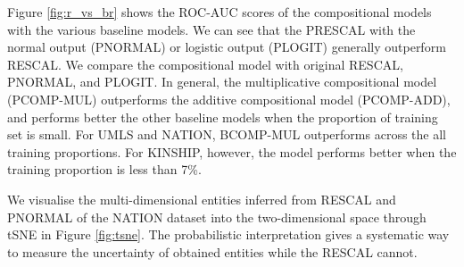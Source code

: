 Figure \ref{fig:r_vs_br} shows the ROC-AUC scores of the compositional models with the various baseline models. We can see that the PRESCAL with the normal output (PNORMAL) or logistic output (PLOGIT) generally outperform RESCAL. We compare the compositional model with original RESCAL, PNORMAL, and PLOGIT. In general, the multiplicative compositional model (PCOMP-MUL) outperforms the additive compositional model (PCOMP-ADD), and performs better the other baseline models when the proportion of training set is small. For UMLS and NATION, BCOMP-MUL outperforms across the all training proportions. For KINSHIP, however, the model performs better when the training proportion is less than 7\%.

We visualise the multi-dimensional entities inferred from RESCAL and PNORMAL of the NATION dataset into the two-dimensional space through tSNE \cite{VanDerMaaten2008} in Figure \ref{fig:tsne}. The probabilistic interpretation gives a systematic way to measure the uncertainty of obtained entities while the RESCAL cannot.

